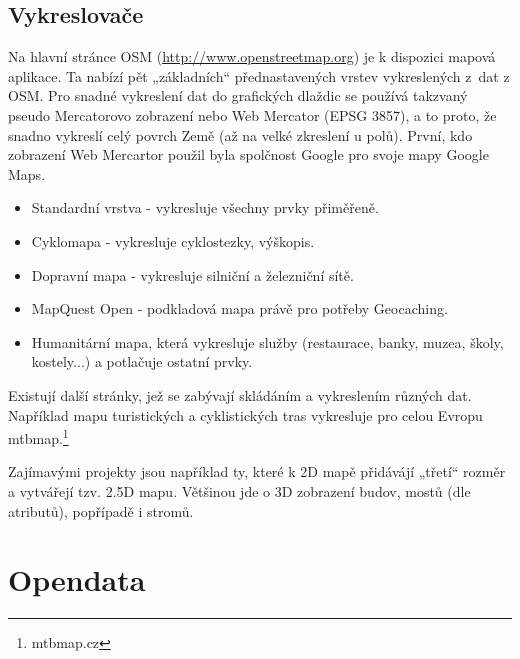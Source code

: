 \subsection{Vykreslovače}
\label{Vykreslovače}
Na hlavní stránce OSM (\url{http://www.openstreetmap.org}) je k dispozici mapová aplikace. Ta nabízí pět
„základních“ přednastavených vrstev vykreslených z~dat z OSM.
Pro snadné vykreslení dat do grafických dlaždic se používá takzvaný pseudo Mercatorovo
zobrazení nebo Web Mercator (EPSG 3857), a to proto, že snadno vykreslí celý povrch Země (až na velké zkreslení u polů). 
První, kdo zobrazení Web Mercartor použil byla spolčnost Google pro svoje mapy Google Maps.\cite{WebMercator}

\begin{itemize}

  \item Standardní vrstva - vykresluje všechny prvky přiměřeně.
  \item Cyklomapa - vykresluje cyklostezky, výškopis. 
  \item Dopravní mapa - vykresluje silniční a železniční sítě.
  \item MapQuest Open - podkladová mapa právě pro potřeby 
    Geocaching.
  \item Humanitární mapa, která vykresluje služby (restaurace, banky, muzea, 
  školy, kostely...)  a potlačuje ostatní prvky. 

\end{itemize}

Existují další stránky, jež se zabývají skládáním a vykreslením
různých dat. Například mapu turistických a cyklistických tras vykresluje
pro celou Evropu mtbmap.\footnote{mtbmap.cz}

Zajímavými projekty jsou například ty, které k 2D mapě přidávájí „třetí“ rozměr a
vytvářejí tzv. 2.5D mapu. Většinou jde o 3D zobrazení budov, mostů (dle
atributů), popřípadě i stromů.



\section{Opendata}
\label{opendata}

